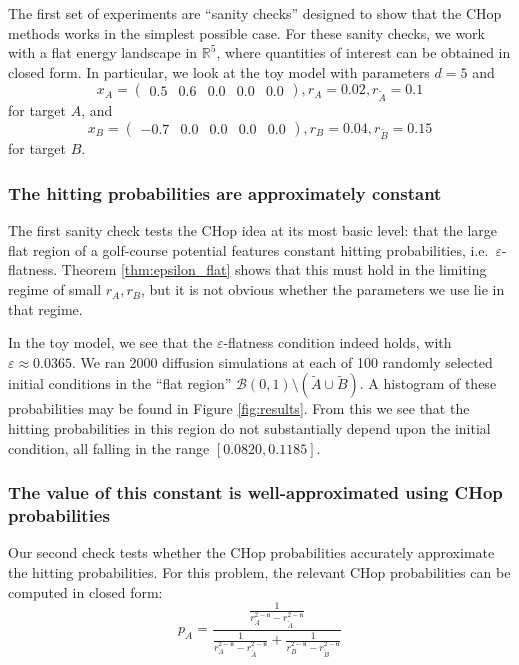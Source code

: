 \documentclass[english, aip, jcp, priprint, graphicx,floatfix]{revtex4-1}
\theoremstyle{plain}
\theoremstyle{definition}
\theoremstyle{plain}
\newcommand{\dimension}{{\mathfrak{n}}}
\begin{document}
The first set of experiments are ``sanity checks'' designed to show that the CHop methods works in the simplest possible case.  For these sanity checks, we work with a flat energy landscape in $\mathbb{R}^5$, where quantities of interest can be obtained in closed form.  In particular, we look at the toy model with parameters $d = 5$ and
\begin{equation*}
x_A = \begin{pmatrix}%
0.5&0.6&0.0&0.0&0.0%
\end{pmatrix},
r_A = 0.02, r_{\tilde{A}} = 0.1
\end{equation*}
for target $A$, and
\begin{equation*}
x_B = \begin{pmatrix}%
-0.7&0.0&0.0&0.0&0.0%
\end{pmatrix},
r_B = 0.04, r_{\tilde{B}} = 0.15
\end{equation*}
for target $B$. 

\subsubsection{The hitting probabilities are approximately constant}

The first sanity check tests the CHop idea at its most basic level: that the large flat region of a golf-course potential features constant hitting probabilities, i.e.\ $\varepsilon$-flatness.  Theorem \ref{thm:epsilon_flat} shows that this must hold in the limiting regime of small $r_A,r_B$, but it is not obvious whether the parameters we use lie in that regime.  

In the toy model, we see that the $\varepsilon$-flatness condition indeed holds, with $\varepsilon \approx 0.0365$.  We ran 2000 diffusion simulations at each of 100 randomly selected initial conditions in the ``flat region'' $\mathcal{B}(0, 1) \setminus (\tilde{A} \cup \tilde{B})$.  A histogram of these probabilities may be found in Figure \ref{fig:results}.  From this we see that the hitting probabilities in this region do not substantially depend upon the initial condition, all falling in the range $[0.0820, 0.1185]$.


\subsubsection{The value of this constant is well-approximated using CHop probabilities}

Our second check tests whether the CHop probabilities accurately approximate the hitting probabilities.  For this problem, the relevant CHop probabilities can be computed in closed form:
\begin{equation}
p_A = \frac{\frac{1}{r_A^{2 - \dimension} - r_{\tilde{A}}^{2 - \dimension}}}{\frac{1}{r_A^{2 - \dimension} - r_{\tilde{A}}^{2 - \dimension}} + \frac{1}{r_B^{2 - \dimension} - r_{\tilde{B}}^{2 - \dimension}}}
\end{equation}
\end{document}
